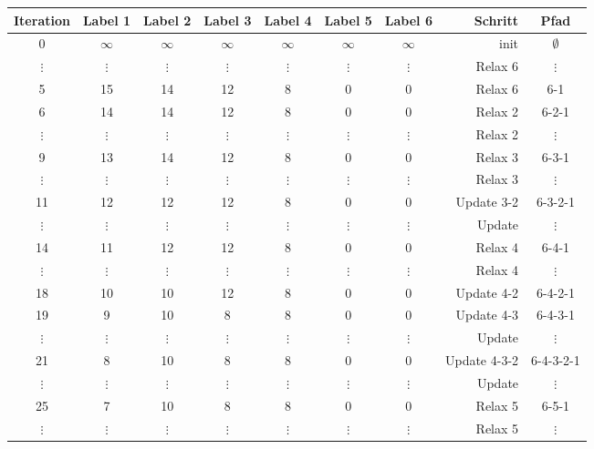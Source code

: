 \documentclass{scrartcl}
\begin{document}
\begin{table}[h]
       \begin{tabular}{c|cccccc|rc}
          Iteration & Label 1 & Label 2 & Label 3 & Label 4 & Label 5 & Label 6 & Schritt & Pfad\\
          \hline\hline
          0       & $\infty$ & $\infty$ & $\infty$ & $\infty$ & $\infty$ & $\infty$ & init & $\emptyset$\\
          $\vdots$       & $\vdots$ & $\vdots$ & $\vdots$ & $\vdots$ & $\vdots$ & $\vdots$ & Relax 6 & $\vdots$\\
          5       & 15 & 14 & 12 & 8 & 0 & 0 & Relax 6 & 6-1\\
          6       & 14 & 14 & 12 & 8 & 0 & 0 & Relax 2 & 6-2-1\\
          $\vdots$       & $\vdots$ & $\vdots$ & $\vdots$ & $\vdots$ & $\vdots$ & $\vdots$ & Relax 2 & $\vdots$\\
          9       & 13 & 14 & 12 & 8 & 0 & 0 & Relax 3 & 6-3-1\\
          $\vdots$       & $\vdots$ & $\vdots$ & $\vdots$ & $\vdots$ & $\vdots$ & $\vdots$ & Relax 3 & $\vdots$\\
          11       & 12 & 12 & 12 & 8 & 0 & 0 & Update 3-2 & 6-3-2-1\\
          $\vdots$       & $\vdots$ & $\vdots$ & $\vdots$ & $\vdots$ & $\vdots$ & $\vdots$ & Update & $\vdots$\\
          14       & 11 & 12 & 12 & 8 & 0 & 0 & Relax 4 & 6-4-1\\
          $\vdots$       & $\vdots$ & $\vdots$ & $\vdots$ & $\vdots$ & $\vdots$ & $\vdots$ & Relax 4 & $\vdots$\\
          18       & 10 & 10 & 12 & 8 & 0 & 0 & Update 4-2 & 6-4-2-1\\
          19       & 9 & 10 & 8 & 8 & 0 & 0 & Update 4-3 & 6-4-3-1\\
          $\vdots$       & $\vdots$ & $\vdots$ & $\vdots$ & $\vdots$ & $\vdots$ & $\vdots$ & Update & $\vdots$\\
          21       & 8 & 10 & 8 & 8 & 0 & 0 & Update 4-3-2 & 6-4-3-2-1\\
          $\vdots$       & $\vdots$ & $\vdots$ & $\vdots$ & $\vdots$ & $\vdots$ & $\vdots$ & Update & $\vdots$\\
          25       & 7 & 10 & 8 & 8 & 0 & 0 & Relax 5 & 6-5-1\\
          $\vdots$       & $\vdots$ & $\vdots$ & $\vdots$ & $\vdots$ & $\vdots$ & $\vdots$ & Relax 5 & $\vdots$\\

\end{tabular}
\end{table}
\end{document}
